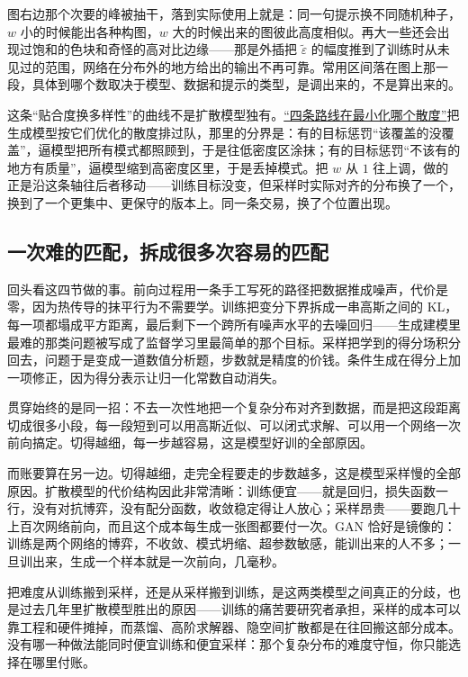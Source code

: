 图右边那个次要的峰被抽干，落到实际使用上就是：同一句提示换不同随机种子，\(w\) 小的时候能出各种构图，\(w\) 大的时候出来的图彼此高度相似。再大一些还会出现过饱和的色块和奇怪的高对比边缘——那是外插把 \(\tilde\varepsilon\) 的幅度推到了训练时从未见过的范围，网络在分布外的地方给出的输出不再可靠。常用区间落在图上那一段，具体到哪个数取决于模型、数据和提示的类型，是调出来的，不是算出来的。

这条``贴合度换多样性''的曲线不是扩散模型独有。\hyperref[sec:14-Deep-Learning/07-Generative-Models-Unified/01]{``四条路线在最小化哪个散度''}把生成模型按它们优化的散度排过队，那里的分界是：有的目标惩罚``该覆盖的没覆盖''，逼模型把所有模式都照顾到，于是往低密度区涂抹；有的目标惩罚``不该有的地方有质量''，逼模型缩到高密度区里，于是丢掉模式。把 \(w\) 从 \(1\) 往上调，做的正是沿这条轴往后者移动——训练目标没变，但采样时实际对齐的分布换了一个，换到了一个更集中、更保守的版本上。同一条交易，换了个位置出现。

\subsection{一次难的匹配，拆成很多次容易的匹配}

回头看这四节做的事。前向过程用一条手工写死的路径把数据推成噪声，代价是零，因为热传导的抹平行为不需要学。训练把变分下界拆成一串高斯之间的 KL，每一项都塌成平方距离，最后剩下一个跨所有噪声水平的去噪回归——生成建模里最难的那类问题被写成了监督学习里最简单的那个目标。采样把学到的得分场积分回去，问题于是变成一道数值分析题，步数就是精度的价钱。条件生成在得分上加一项修正，因为得分表示让归一化常数自动消失。

贯穿始终的是同一招：不去一次性地把一个复杂分布对齐到数据，而是把这段距离切成很多小段，每一段短到可以用高斯近似、可以闭式求解、可以用一个网络一次前向搞定。切得越细，每一步越容易，这是模型好训的全部原因。

而账要算在另一边。切得越细，走完全程要走的步数越多，这是模型采样慢的全部原因。扩散模型的代价结构因此非常清晰：训练便宜——就是回归，损失函数一行，没有对抗博弈，没有配分函数，收敛稳定得让人放心；采样昂贵——要跑几十上百次网络前向，而且这个成本每生成一张图都要付一次。GAN 恰好是镜像的：训练是两个网络的博弈，不收敛、模式坍缩、超参数敏感，能训出来的人不多；一旦训出来，生成一个样本就是一次前向，几毫秒。

把难度从训练搬到采样，还是从采样搬到训练，是这两类模型之间真正的分歧，也是过去几年里扩散模型胜出的原因——训练的痛苦要研究者承担，采样的成本可以靠工程和硬件摊掉，而蒸馏、高阶求解器、隐空间扩散都是在往回搬这部分成本。没有哪一种做法能同时便宜训练和便宜采样：那个复杂分布的难度守恒，你只能选择在哪里付账。

